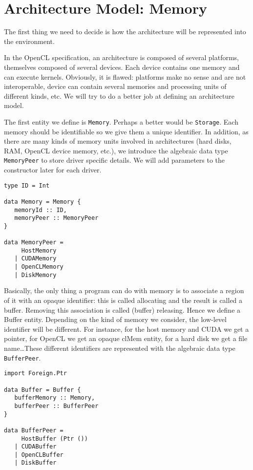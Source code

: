 \chapter{Architecture Model: Memory}

The first thing we need to decide is how the architecture will be represented
into the environment. 

In the OpenCL specification, an architecture is composed of several platforms,
themselves composed of several devices. Each device contains one memory and can
execute kernels. Obviously, it is flawed: platforms make no sense and are not
interoperable, device can contain several memories and processing units of
different kinds, etc. We will try to do a better job at defining an architecture
model.

The first entity we define is \texttt{Memory}. Perhaps a better would be
\texttt{Storage}. Each memory should be identifiable so we give them a unique
identifier. In addition, as there are many kinds of memory units
involved in architectures (hard disks, RAM, OpenCL device memory, etc.), we
introduce the algebraic data type \texttt{MemoryPeer} to store driver
specific details. We will add parameters to the constructor later for each
driver.

\begin{lstlisting}
type ID = Int

data Memory = Memory {
   memoryId :: ID,
   memoryPeer :: MemoryPeer
}

data MemoryPeer =
     HostMemory
   | CUDAMemory
   | OpenCLMemory
   | DiskMemory
\end{lstlisting}

Basically, the only thing a program can do with memory is to associate a region
of it with an opaque identifier: this is called allocating and the result is
called a buffer. Removing this association is called (buffer) releasing. Hence
we define a Buffer entity. Depending on the kind of memory we consider, the
low-level identifier will be different. For instance, for the host memory and
CUDA we get a pointer, for OpenCL we get an opaque clMem entity, for a hard disk
we get a file name\ldots These different identifiers are represented with the
algebraic data type \texttt{BufferPeer}.

\begin{lstlisting}
import Foreign.Ptr

data Buffer = Buffer {
   bufferMemory :: Memory,
   bufferPeer :: BufferPeer
}

data BufferPeer = 
     HostBuffer (Ptr ())
   | CUDABuffer
   | OpenCLBuffer
   | DiskBuffer
\end{lstlisting}

